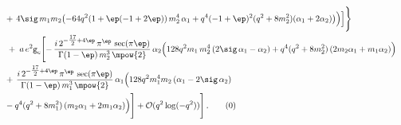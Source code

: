 \begin{tcolorbox}[thesisresultbox, title=\textit{Full one loop amplitude in small $|q|$ expansion}, boxsep=0.5mm, left=0.5mm, right=0.5mm, top=0.5mm, bottom=0.5mm]
\begin{align*}
\\
&\hspace{0cm}
 +\,4 \sig\,m_1 m_2\bigl(-64 q^{2}(1+\ep(-1+2\ep))\,m_2^{4}\,\alpha_1
        + q^{4}(-1+\ep)^{2}(q^{2}+8 m_2^{2})(\alpha_1+2\alpha_2)\bigr)
 \Bigr)
\Bigr]
\Biggr\}
\\ &\hspace{0cm}\;+\; a\,e^{2} \texttt{g}_c \Biggl[
 -\, \frac{i\,2^{-\tfrac{17}{2}+4\ep}\,\pi^{\ep}\,\sec(\pi\ep)}
             {\Gamma(1-\ep)\,m_2^{3}\,\mpow{2}}\,
 \alpha_2 \Bigl( 128 q^{2} m_1\,m_2^{4}\,(2\sig\,\alpha_1 - \alpha_2)
       + q^{4}(q^{2}+8 m_2^{2})\,(2 m_2 \alpha_1 + m_1 \alpha_2) \Bigr)
\\
&\hspace{0cm}
 +\, \frac{i\,2^{-\tfrac{17}{2}+4\ep}\,\pi^{\ep}\,\sec(\pi\ep)}
             {\Gamma(1-\ep)\,m_1^{3}\,\mpow{2}}\,
 \alpha_1 \Bigl(
   128 q^{2} m_1^{4} m_2\,(\alpha_1-2\sig\,\alpha_2)
\\
&\hspace{0cm}
       - q^{4}(q^{2}+8 m_1^{2})\,(m_2 \alpha_1 + 2 m_1 \alpha_2)
 \Bigr)
\Biggr]
    +\mathcal{O}(q^2 \log(-q^2))\Biggr]\,.\tag{\theequation}
\end{align*}
\endgroup
\end{tcolorbox}
\restorethesisbodyformat
